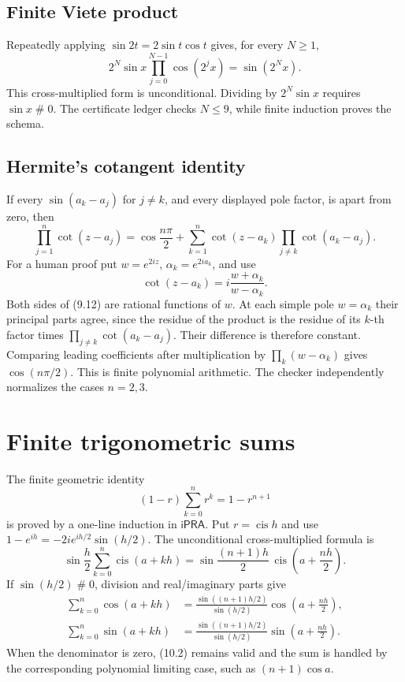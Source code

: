 \documentclass[11pt]{article}
\theoremstyle{definition}
\newcommand{\iPRA}{\mathsf{iPRA}}
\newcommand{\cis}{\operatorname{cis}}
\newcommand{\apart}{\mathrel{\#}}
\begin{document}
\subsection{Finite Viete product}

Repeatedly applying \(\sin2t=2\sin t\cos t\) gives, for every \(N\ge1\),
\[
 2^N\sin x\prod_{j=0}^{N-1}\cos(2^jx)=\sin(2^Nx).
 \tag{9.11}
\]
This cross-multiplied form is unconditional.  Dividing by \(2^N\sin x\)
requires \(\sin x\apart0\).  The certificate ledger checks \(N\le9\), while
finite induction proves the schema.

\subsection{Hermite's cotangent identity}

If every \(\sin(a_k-a_j)\) for \(j\ne k\), and every displayed pole factor,
is apart from zero, then
\[
 \prod_{j=1}^n\cot(z-a_j)
 =\cos\frac{n\pi}{2}
 +\sum_{k=1}^n\cot(z-a_k)
   \prod_{j\ne k}\cot(a_k-a_j).
 \tag{9.12}
\]
For a human proof put \(w=e^{2iz}\), \(\alpha_k=e^{2ia_k}\), and use
\[
 \cot(z-a_k)=i\frac{w+\alpha_k}{w-\alpha_k}.
 \tag{9.13}
\]
Both sides of (9.12) are rational functions of \(w\).  At each simple pole
\(w=\alpha_k\) their principal parts agree, since the residue of the product is
the residue of its \(k\)-th factor times
\(\prod_{j\ne k}\cot(a_k-a_j)\).  Their difference is therefore constant.
Comparing leading coefficients after multiplication by
\(\prod_k(w-\alpha_k)\) gives \(\cos(n\pi/2)\).  This is finite polynomial
arithmetic.  The checker independently normalizes the cases \(n=2,3\).

\section{Finite trigonometric sums}
\label{sec:finite-sums}

The finite geometric identity
\[
 (1-r)\sum_{k=0}^nr^k=1-r^{n+1}
 \tag{10.1}
\]
is proved by a one-line induction in \(\iPRA\).  Put \(r=\cis h\) and use
\(1-e^{ih}=-2ie^{ih/2}\sin(h/2)\).  The unconditional cross-multiplied formula
is
\[
 \sin\frac h2\sum_{k=0}^n\cis(a+kh)
 =\sin\frac{(n+1)h}{2}\,
  \cis\left(a+\frac{nh}{2}\right).
 \tag{10.2}
\]
If \(\sin(h/2)\apart0\), division and real/imaginary parts give
\begin{align}
 \sum_{k=0}^n\cos(a+kh)
 &=\frac{\sin((n+1)h/2)}{\sin(h/2)}
   \cos\left(a+\frac{nh}{2}\right),\tag{10.3}\\
 \sum_{k=0}^n\sin(a+kh)
 &=\frac{\sin((n+1)h/2)}{\sin(h/2)}
   \sin\left(a+\frac{nh}{2}\right).
 \tag{10.4}
\end{align}
When the denominator is zero, (10.2) remains valid and the sum is handled by
the corresponding polynomial limiting case, such as \((n+1)\cos a\).
\end{document}
